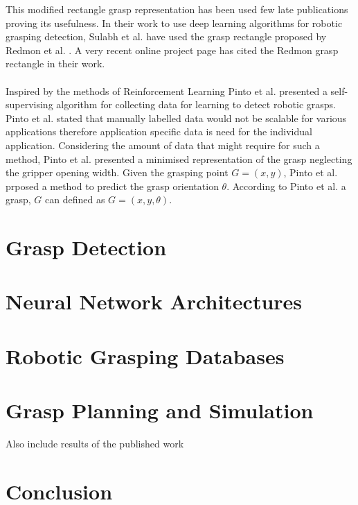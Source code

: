 \documentclass{vldb}
\begin{document}
This modified rectangle grasp representation has been used few late publications proving its usefulness. In their work to use deep learning algorithms for robotic grasping detection, Sulabh et al. \cite{sulabh} have used the grasp rectangle proposed by Redmon et al. \cite{redmon}. A very recent online project page \cite{redmon} has cited the Redmon grasp rectangle in their work.
\\ \\
Inspired by the methods of Reinforcement Learning \cite{mnih} Pinto et al. \cite{pinto} presented a self-supervising algorithm for collecting data for learning to detect robotic grasps. Pinto et al. \cite{pinto} stated that manually labelled data would not be scalable for various applications therefore application specific data is need for the individual application. Considering the amount of data that might require for such a method, Pinto et al. \cite{pinto} presented a minimised representation of the grasp neglecting the gripper opening width. Given the grasping point $G=(x,y)$, Pinto et al. \cite{pinto} prposed a method to predict the grasp orientation $\theta$. According to Pinto et al. \cite{pinto} a grasp, $G$ can defined as $G = (x, y, \theta)$.   
\section{Grasp Detection}
\section{Neural Network Architectures}
\section{Robotic Grasping Databases}
\section{Grasp Planning and Simulation}
Also include results of the published work
\section{Conclusion}




\end{document}
